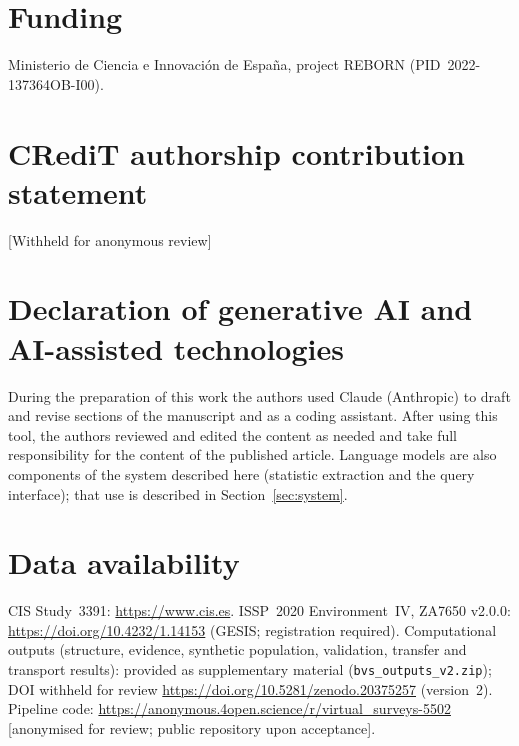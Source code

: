 \section*{Funding}
\else
Ministerio de Ciencia e Innovaci\'on de Espa\~na, project REBORN (PID~2022-137364OB-I00).
\fi

\section*{CRediT authorship contribution statement}
[Withheld for anonymous review]

\section*{Declaration of generative AI and AI-assisted technologies}
During the preparation of this work the authors used Claude (Anthropic) to
draft and revise sections of the manuscript and as a coding assistant. After
using this tool, the authors reviewed and edited the content as needed and take
full responsibility for the content of the published article. Language models
are also components of the system described here (statistic extraction and the
query interface); that use is described in Section~\ref{sec:system}.

\section*{Data availability}
CIS Study~3391: \url{https://www.cis.es}.
ISSP~2020 Environment~IV, ZA7650 v2.0.0: \url{https://doi.org/10.4232/1.14153}
(GESIS; registration required).
Computational outputs (structure, evidence, synthetic population, validation,
transfer and transport results): \ifblind provided as supplementary material
(\texttt{bvs\_outputs\_v2.zip}); DOI withheld for review\else
\url{https://doi.org/10.5281/zenodo.20375257} (version~2)\fi.
Pipeline code: \url{https://anonymous.4open.science/r/virtual_surveys-5502}
[anonymised for review; public repository upon acceptance].

